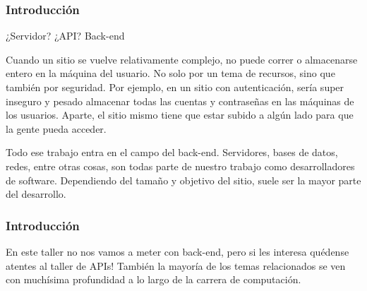 \begin{frame}
    \frametitle{Introducción}
    \begin{tcolorbox}[colframe=color1]
        \begin{center}
            ¿Servidor? ¿API? Back-end
        \end{center}
    \end{tcolorbox}

    Cuando un sitio se vuelve relativamente complejo, no puede correr 
    o almacenarse entero en la máquina del usuario. No solo por un tema 
    de recursos, sino que también por seguridad. Por ejemplo, en un sitio 
    con autenticación, sería super inseguro y pesado almacenar todas las 
    cuentas y contraseñas en las máquinas de los usuarios. Aparte, el 
    sitio mismo tiene que estar subido a algún lado para que la gente pueda 
    acceder.

    Todo ese trabajo entra en el campo del back-end. Servidores, bases de 
    datos, redes, entre otras cosas, son todas parte de nuestro trabajo 
    como desarrolladores de software. Dependiendo del tamaño y objetivo del 
    sitio, suele ser la mayor parte del desarrollo.

\end{frame}

\begin{frame}
    \frametitle{Introducción}

    En este taller no nos vamos a meter con back-end, pero si les interesa 
    quédense atentes al taller de APIs! También la mayoría de los temas 
    relacionados se ven con muchísima profundidad a lo largo de la carrera 
    de computación.

\end{frame}

